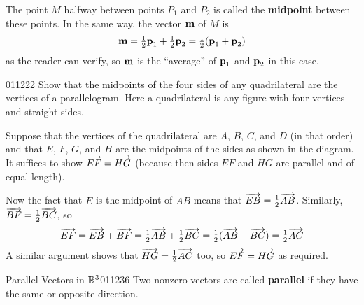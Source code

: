 The point $M$ halfway between points $P_{1}$ and $P_{2}$ is called the \textbf{midpoint} between these points. In the same way, the vector $\textbf{m}$ of $M$ is
\begin{equation*}
\textbf{m} = \tfrac{1}{2}\textbf{p}_{1} + \tfrac{1}{2}\textbf{p}_{2} = \tfrac{1}{2}(\textbf{p}_{1} + \textbf{p}_{2})
\end{equation*}
as the reader can verify, so $\textbf{m}$ is the ``average'' of $\textbf{p}_{1}$ and $\textbf{p}_{2}$ in this case.


\begin{example}{}{011222}
Show
 that the midpoints of the four sides of any quadrilateral are the 
vertices of a parallelogram. Here a quadrilateral is any figure with 
four vertices and straight sides.

 \begin{solution} Suppose that the vertices of the quadrilateral are $A$, $B$, $C$, and $D$ (in that order) and that $E$, $F$, $G$, and $H$ are the midpoints of the sides as shown in the diagram. It suffices to show $\overrightarrow{EF} = \overrightarrow{HG}$
 (because then sides $EF$ and $HG$ are parallel and of equal length). 

\newpage
\begin{wrapfigure}[7]{l}{5cm} 
	\centering
	
\end{wrapfigure}


\setlength{\rightskip}{0pt plus 200pt} Now the fact that $E$ is the midpoint of $AB$ means that $\overrightarrow{EB} = \tfrac{1}{2}\overrightarrow{AB}$. Similarly, $\overrightarrow{BF} = \tfrac{1}{2}\overrightarrow{BC}$, so
\begin{equation*}
 \overrightarrow{EF} = \overrightarrow{EB} + \overrightarrow{BF} = \tfrac{1}{2}\overrightarrow{AB} + \tfrac{1}{2}\overrightarrow{BC} = \tfrac{1}{2}(\overrightarrow{AB} + \overrightarrow{BC}) = \tfrac{1}{2}\overrightarrow{AC}
\end{equation*}
A similar argument shows that $\overrightarrow{HG} = \tfrac{1}{2}\overrightarrow{AC}$ too, so $\overrightarrow{EF} = \overrightarrow{HG}$ as required.
\vspace*{2em}
\end{solution}
\end{example}


\begin{definition}{Parallel Vectors in $\mathbb{R}^3$}{011236}
Two nonzero vectors are called \textbf{parallel} if they have the same or opposite direction.
\end{definition}

